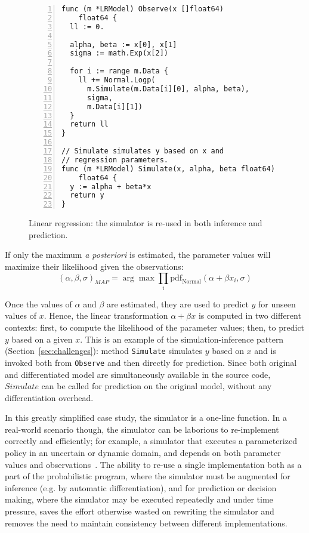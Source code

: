 \documentclass[sigplan,10pt,screen]{acmart}
\begin{document}
\begin{sloppypar}
\begin{figure}
\begin{lstlisting}[framexleftmargin=10pt,numbers=left]
func (m *LRModel) Observe(x []float64)
    float64 {
  ll := 0.

  alpha, beta := x[0], x[1]
  sigma := math.Exp(x[2])

  for i := range m.Data {
    ll += Normal.Logp(
      m.Simulate(m.Data[i][0], alpha, beta),
      sigma,
      m.Data[i][1])
  }
  return ll
}

// Simulate simulates y based on x and
// regression parameters.
func (m *LRModel) Simulate(x, alpha, beta float64)
    float64 {
  y := alpha + beta*x
  return y
}
\end{lstlisting}
\caption{Linear regression: the simulator is re-used in both
  inference and prediction.}
\label{fig:linear-regression}
\end{figure}
If only the maximum \textit{a posteriori} is estimated, the
parameter values will maximize their likelihood given the
observations:
\begin{equation}
  (\alpha, \beta, \sigma)_{MAP} = \arg \max \prod\limits_i \mathrm{pdf}_\mathrm{Normal}(\alpha + \beta x_i, \sigma)
  \label{eqn:linear-regression-2}
\end{equation}

Once the values of $\alpha$ and $\beta$ are estimated, they are
used to predict $y$ for unseen values of $x$. Hence, the linear
transformation $\alpha + \beta x$ is computed in two different
contexts: first, to compute the likelihood of the parameter
values; then, to predict $y$ based on a given $x$. This is an
example of the simulation-inference pattern
(Section~\ref{sec:challenges}): method \lstinline{Simulate}
simulates $y$ based on $x$ and is invoked both from
\lstinline{Observe} and then directly for prediction.  Since
both original and differentiated model are simultaneously
available in the source code, $Simulate$ can be called
for prediction on the original model, without any
differentiation overhead.

In this greatly simplified case study, the simulator is a
one-line function. In a real-world scenario though, the
simulator can be laborious to re-implement correctly and
efficiently; for example, a simulator that executes a
parameterized policy in an uncertain or dynamic domain, and
depends on both parameter values and observations~\cite{MPT+16}.
The ability to re-use a single implementation both as a part of
the probabilistic program, where the simulator must be augmented
for inference (e.g. by automatic differentiation), and for
prediction or decision making, where the simulator may be
executed repeatedly and under time pressure, saves the effort
otherwise wasted on rewriting the simulator and removes the need
to maintain consistency between different implementations.


\end{sloppypar}
\end{document}
